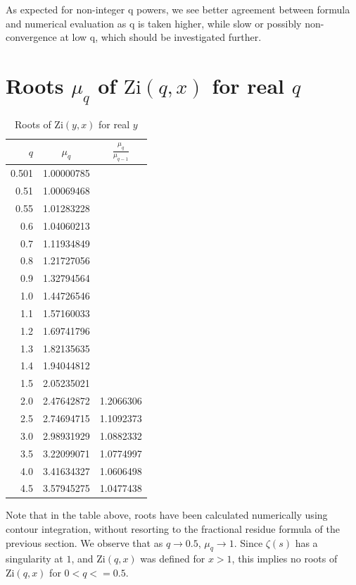 \documentclass[a4paper,11pt,twoside]{amsart}
\newcommand\Zi{\mathrm{Zi}}
\begin{document}
As expected for non-integer q powers, we see better agreement between formula and numerical evaluation as q is taken higher, while slow or possibly non-convergence at low q, which should be investigated further.

\section{Roots $\mu_q$ of $\Zi(q,x)$ for real $q$}

\begin{table}[H]
  \begin{center}
    \caption{Roots of $\Zi(y,x)$ for real $y$}
    \label{tab:table4}
    \begin{tabular}{r|c|c} 
      $q$ & $\mu_{q}$ & $\frac{\mu_{q}}{\mu_{q-1}}$\\
      \hline
      0.501 & 1.00000785 & \\
      0.51 & 1.00069468 & \\
      0.55 & 1.01283228 & \\
      0.6 & 1.04060213 & \\
      0.7 & 1.11934849 & \\
      0.8 & 1.21727056 & \\
      0.9 & 1.32794564 & \\
      1.0 & 1.44726546 & \\
      1.1 & 1.57160033 & \\
      1.2 & 1.69741796 & \\
      1.3 & 1.82135635 & \\
      1.4 & 1.94044812 & \\
      1.5 & 2.05235021 & \\
      2.0 & 2.47642872 & 1.2066306 \\
      2.5 & 2.74694715 & 1.1092373 \\
      3.0 & 2.98931929 & 1.0882332 \\
      3.5 & 3.22099071 & 1.0774997 \\
      4.0 & 3.41634327 & 1.0606498 \\
      4.5 & 3.57945275 & 1.0477438 \\
    \end{tabular}
  \end{center}
\end{table}

Note that in the table above, roots have been calculated numerically using contour integration, without resorting to the fractional residue formula of the previous section.  We observe that as $q \to 0.5$, $\mu_{q} \to 1$. Since $\zeta(s)$ has a singularity at $1$, and $\Zi(q,x)$ was defined for $x>1$, this implies no roots of $\Zi(q,x)$ for $0 < q <=0.5$.
\end{document}
